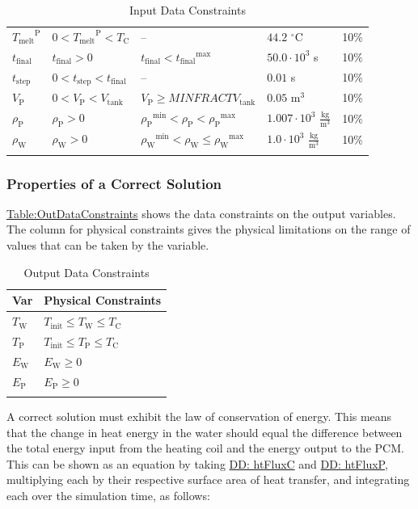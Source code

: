 \documentclass[12pt]{article}
\begin{document}
\begin{longtable}{l l l l l}
\\
${{T_{\text{melt}}}^{\text{P}}}$ & $0<{{T_{\text{melt}}}^{\text{P}}}<{T_{\text{C}}}$ & -- & $44.2$ ${}^{\circ}$C & 10$\%$
\\
${t_{\text{final}}}$ & ${t_{\text{final}}}>0$ & ${t_{\text{final}}}<{{t_{\text{final}}}^{\text{max}}}$ & $50.0\cdot{}10^{3}$ s & 10$\%$
\\
${t_{\text{step}}}$ & $0<{t_{\text{step}}}<{t_{\text{final}}}$ & -- & $0.01$ s & 10$\%$
\\
${V_{\text{P}}}$ & $0<{V_{\text{P}}}<{V_{\text{tank}}}$ & ${V_{\text{P}}}\geq{}MINFRACT {V_{\text{tank}}}$ & $0.05$ $\text{m}^{3}$ & 10$\%$
\\
${ρ_{\text{P}}}$ & ${ρ_{\text{P}}}>0$ & ${{ρ_{\text{P}}}^{\text{min}}}<{ρ_{\text{P}}}<{{ρ_{\text{P}}}^{\text{max}}}$ & $1.007\cdot{}10^{3}$ $\frac{\text{kg}}{\text{m}^{3}}$ & 10$\%$
\\
${ρ_{\text{W}}}$ & ${ρ_{\text{W}}}>0$ & ${{ρ_{\text{W}}}^{\text{min}}}<{ρ_{\text{W}}}\leq{}{{ρ_{\text{W}}}^{\text{max}}}$ & $1.0\cdot{}10^{3}$ $\frac{\text{kg}}{\text{m}^{3}}$ & 10$\%$
\\
\bottomrule
\caption{Input Data Constraints}
\label{Table:InDataConstraints}
\end{longtable}
\subsubsection{Properties of a Correct Solution}
\label{Sec:CorSolProps}
\hyperref[Table:OutDataConstraints]{Table:OutDataConstraints} shows the data constraints on the output variables. The column for physical constraints gives the physical limitations on the range of values that can be taken by the variable.

\begin{longtable}{l l}
\toprule
\textbf{Var} & \textbf{Physical Constraints}
\\
\midrule
\endhead
${T_{\text{W}}}$ & ${T_{\text{init}}}\leq{}{T_{\text{W}}}\leq{}{T_{\text{C}}}$
\\
${T_{\text{P}}}$ & ${T_{\text{init}}}\leq{}{T_{\text{P}}}\leq{}{T_{\text{C}}}$
\\
${E_{\text{W}}}$ & ${E_{\text{W}}}\geq{}0$
\\
${E_{\text{P}}}$ & ${E_{\text{P}}}\geq{}0$
\\
\bottomrule
\caption{Output Data Constraints}
\label{Table:OutDataConstraints}
\end{longtable}
A correct solution must exhibit the law of conservation of energy. This means that the change in heat energy in the water should equal the difference between the total energy input from the heating coil and the energy output to the PCM. This can be shown as an equation by taking \hyperref[DD:htFluxC]{DD: htFluxC} and \hyperref[DD:htFluxP]{DD: htFluxP}, multiplying each by their respective surface area of heat transfer, and integrating each over the simulation time, as follows:
\end{document}
